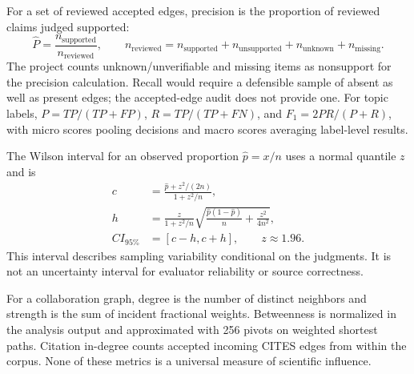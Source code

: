 For a set of reviewed accepted edges, precision is the proportion of reviewed
claims judged supported:
\begin{equation}
  \widehat{P}=\frac{n_{\text{supported}}}{n_{\text{reviewed}}},
  \qquad
  n_{\text{reviewed}}=n_{\text{supported}}+n_{\text{unsupported}}+
  n_{\text{unknown}}+n_{\text{missing}}.
\end{equation}
The project counts unknown/unverifiable and missing items as nonsupport for the
precision calculation. Recall would require a defensible sample of absent as
well as present edges; the accepted-edge audit does not provide one. For topic
labels, $P=TP/(TP+FP)$, $R=TP/(TP+FN)$, and $F_1=2PR/(P+R)$, with micro scores
pooling decisions and macro scores averaging label-level results.

The Wilson interval for an observed proportion $\widehat{p}=x/n$ uses a normal
quantile $z$ and is
\begin{align}
  c &= \frac{\widehat{p}+z^2/(2n)}{1+z^2/n},\\
  h &= \frac{z}{1+z^2/n}
       \sqrt{\frac{\widehat{p}(1-\widehat{p})}{n}+\frac{z^2}{4n^2}},\\
  CI_{95\%} &= [c-h, c+h], \qquad z\approx1.96.
\end{align}
This interval describes sampling variability conditional on the judgments. It is
not an uncertainty interval for evaluator reliability or source correctness.

For a collaboration graph, degree is the number of distinct neighbors and
strength is the sum of incident fractional weights. Betweenness is normalized
in the analysis output and approximated with 256 pivots on weighted shortest
paths. Citation in-degree counts accepted incoming CITES edges from within the
corpus. None of these metrics is a universal measure of scientific influence.
